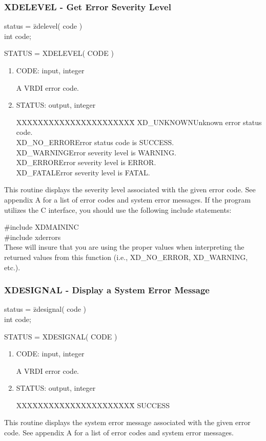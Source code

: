 \subsubsection{XDELEVEL - Get Error Severity Level}
\begin{tabbing}
status = \=zdelevel( code )\\
\>int  code;\\
\end{tabbing}
STATUS = XDELEVEL( CODE )
\begin{enumerate}
\item CODE:  input, integer

A VRDI error code.
\item STATUS:  output, integer
\begin{tabbing}
XXXXXXXXXXXXXXXXXXXXXX\=\kill
XD\_UNKNOWN\>Unknown error status code.\\
XD\_NO\_ERROR\>Error status code is SUCCESS.\\
XD\_WARNING\>Error severity level is WARNING.\\
XD\_ERROR\>Error severity level is ERROR.\\
XD\_FATAL\>Error severity level is FATAL.\\
\end{tabbing}
\end{enumerate}
This routine displays the severity level associated with the
given error code.  See appendix A for a list of error codes and
system error messages.  If the program utilizes the C interface,
you should use the following include statements:

\#include XDMAININC\\
\#include xderrors\\

These will insure that you are using the proper values when interpreting
the returned values from this function (i.e., XD\_NO\_ERROR, XD\_WARNING,
etc.).
\newpage
\subsubsection{XDESIGNAL - Display a System Error Message}
\begin{tabbing}
status = \=zdesignal( code )\\
\>int  code;\\
\end{tabbing}
STATUS = XDESIGNAL( CODE )
\begin{enumerate}
\item CODE:  input, integer

A VRDI error code.
\item STATUS:  output, integer
\begin{tabbing}
XXXXXXXXXXXXXXXXXXXXXX\=\kill
SUCCESS\\
\end{tabbing}
\end{enumerate}
This routine displays the system error message associated with the
given error code.  See appendix A for a list of error codes and
system error messages.
\newpage
